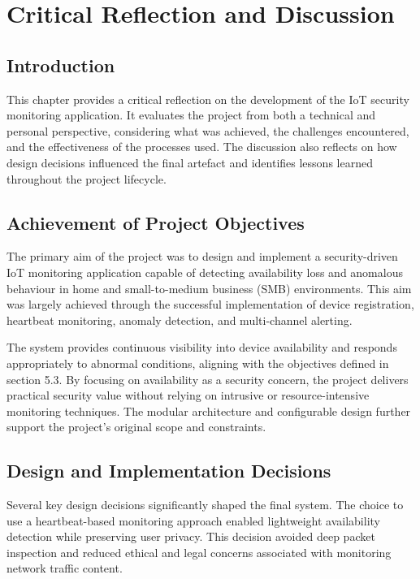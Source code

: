 \chapter{Critical Reflection and Discussion}
\label{ch:reflect}

\section{Introduction}

This chapter provides a critical reflection on the development of the IoT security monitoring application. It evaluates the project from both a technical and personal perspective, considering what was achieved, the challenges encountered, and the effectiveness of the processes used. The discussion also reflects on how design decisions influenced the final artefact and identifies lessons learned throughout the project lifecycle.

\section{Achievement of Project Objectives}

The primary aim of the project was to design and implement a security-driven IoT monitoring application capable of detecting availability loss and anomalous behaviour in home and small-to-medium business (SMB) environments. This aim was largely achieved through the successful implementation of device registration, heartbeat monitoring, anomaly detection, and multi-channel alerting.

The system provides continuous visibility into device availability and responds appropriately to abnormal conditions, aligning with the objectives defined in section 5.3. By focusing on availability as a security concern, the project delivers practical security value without relying on intrusive or resource-intensive monitoring techniques. The modular architecture and configurable design further support the project's original scope and constraints.

\section{Design and Implementation Decisions}

Several key design decisions significantly shaped the final system. The choice to use a heartbeat-based monitoring approach enabled lightweight availability detection while preserving user privacy. This decision avoided deep packet inspection and reduced ethical and legal concerns associated with monitoring network traffic content.

